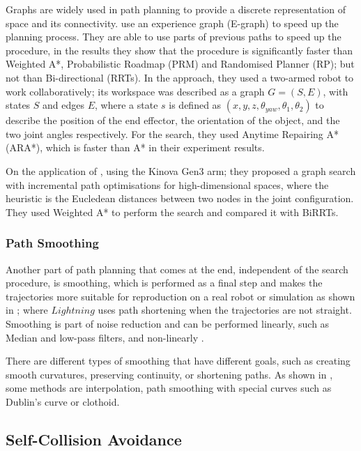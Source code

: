 \documentclass[thesis]{mas_proposal}
\begin{document}
    Graphs are widely used in path planning to provide a discrete representation of space and its connectivity. \cite{Phillips2012} use an experience graph (E-graph) to speed up the planning process. They are able to use parts of previous paths to speed up the procedure, in the results they show that the procedure is significantly faster than Weighted A*, Probabilistic Roadmap (PRM) and Randomised Planner (RP); but not than Bi-directional (RRTs). In the \cite{Cohen2012} approach, they used a two-armed robot to work collaboratively; its workspace was described as a graph $G = (S, E)$, with states $S$ and edges $E$, where a state $s$ is defined as $(x, y, z, \theta_{yaw}, \theta_{1}, \theta_{2})$ to describe the position of the end effector, the orientation of the object, and the two joint angles respectively. For the search, they used Anytime Repairing A* (ARA*), which is faster than A* in their experiment results.
    
    On the application of \cite{Natarajan2023}, using the Kinova Gen3 arm; they proposed a graph search with incremental path optimisations for high-dimensional spaces, where the heuristic is the Eucledean distances between two nodes in the joint configuration. They used Weighted A* to perform the search and compared it with BiRRTs.
    
    \subsubsection{Path Smoothing}
    
    Another part of path planning that comes at the end, independent of the search procedure, is smoothing, which is performed as a final step and makes the trajectories more suitable for reproduction on a real robot or simulation as shown in \cite{Berenson2012, Coleman2015}; where $Lightning$ uses path shortening when the trajectories are not straight. Smoothing is part of noise reduction and can be performed linearly, such as Median and low-pass filters, and non-linearly \cite{Siegwart2011, Ravichandar2020, Si2021}.
    
    There are different types of smoothing that have different goals, such as creating smooth curvatures, preserving continuity, or shortening paths. As shown in \cite{Ravankar2018}, some methods are interpolation, path smoothing with special curves such as Dublin's curve or clothoid.
    
    \subsection{Self-Collision Avoidance}
    
\end{document}
